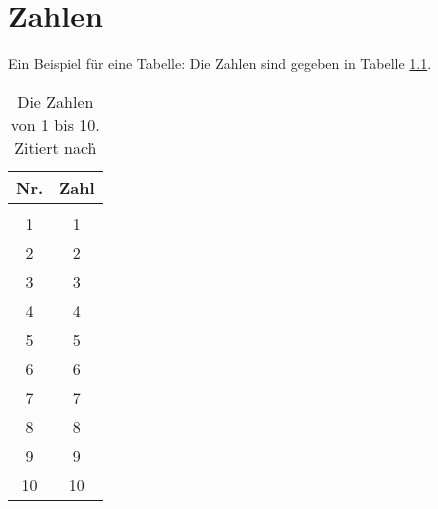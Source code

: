 \chapter{Zahlen}
Ein Beispiel f\"ur eine Tabelle: Die Zahlen sind gegeben in Tabelle \ref{tab-zahlen}.

\begin{table}
\begin{center}
\begin{tabular}{c|c}
Nr. & Zahl \\
\hline{} \\
1 & 1\\
2 & 2\\
3 & 3\\
4 & 4\\
5 & 5\\
6 & 6\\
7 & 7\\
8 & 8\\
9 & 9\\
10 & 10 \\
\end{tabular}
\end{center}
\caption{Die Zahlen von 1 bis 10. Zitiert nach\.}
\label{tab-zahlen}
\end{table} 
